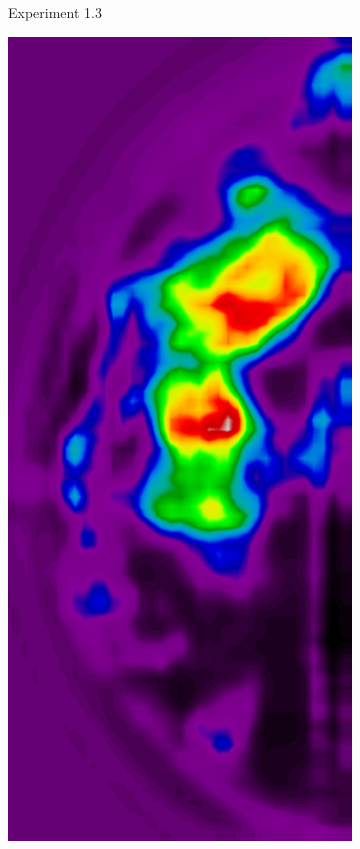 \begin{figure}[h!]
\begin{subfigure}{0.195\textwidth}
		\caption{Experiment 1.3}
    \end{subfigure}
	\begin{subfigure}{0.195\textwidth}
		\centering
			\includegraphics[width=\textwidth]{plots/examples/example3_probs_2.png}

\end{subfigure}
\end{figure}
